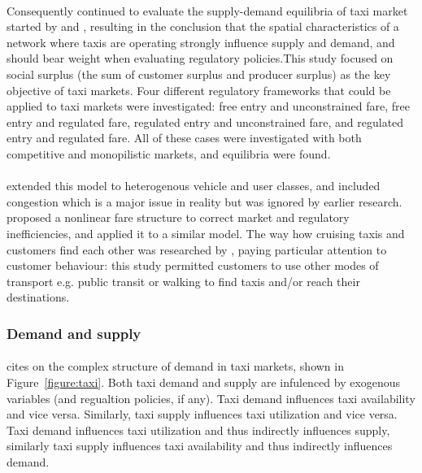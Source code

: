 \paragraph{}Consequently \textcite{Yang2002taxi+demand} continued to evaluate
the supply-demand equilibria of taxi market started by
\textcite{Yang1998taxi+network} and \textcite{Yang2000taxi+utilization},
resulting in the conclusion that the spatial characteristics of a network where
taxis are operating strongly influence supply and demand, and should bear
weight when evaluating regulatory policies.This study focused on social surplus
(the sum of customer surplus and producer surplus) as the key objective of taxi
markets. Four different regulatory frameworks that could be applied to taxi
markets were investigated: free entry and unconstrained fare, free entry and
regulated fare, regulated entry and unconstrained fare, and regulated entry and
regulated fare. All of these cases were investigated with both competitive and
monopilistic markets, and equilibria were found.

\paragraph{}\textcite{Wong2008taxi+modeling} extended this model to
heterogenous vehicle and user classes, and included congestion which is a major
issue in reality but was ignored by earlier research.
\textcite{Yang2010taxi+nonlinear} proposed a nonlinear fare structure to
correct market and regulatory inefficiencies, and applied it to a similar
model. The way how cruising taxis and customers find each other was researched
by \textcite{Yang2010taxi+equilibria}, paying particular attention to customer
behaviour: this study permitted customers to use other modes of transport e.g.
public transit or walking to find taxis and/or reach their destinations.

\subsubsection{Demand and supply}

\paragraph{} \textcite{Yang2002taxi+demand} cites
\textcite{Manski1967taxi+demand} on the complex structure of demand in taxi
markets, shown in Figure~\ref{figure:taxi}. Both taxi demand and supply are
infulenced by exogenous variables (and regualtion policies, if any). Taxi
demand influences taxi availability and vice versa. Similarly, taxi supply
influences taxi utilization and vice versa. Taxi demand influences taxi
utilization and thus indirectly influences supply, similarly taxi supply
influences taxi availability and thus indirectly influences demand. 

